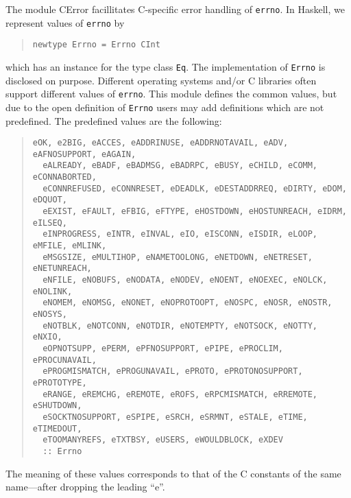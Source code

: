\documentclass[a4paper,twosides]{article}
\newcommand{\code}[1]{\texttt{#1}}      %
\begin{document}
The module CError facillitates C-specific error handling of \code{errno}.  In
Haskell, we represent values of \code{errno} by
%
\begin{quote}
\begin{verbatim}
newtype Errno = Errno CInt
\end{verbatim}
\end{quote}
%
which has an instance for the type class \code{Eq}.  The implementation of
\code{Errno} is disclosed on purpose.  Different operating systems and/or C
libraries often support different values of \code{errno}.  This module defines
the common values, but due to the open definition of \code{Errno} users may
add definitions which are not predefined.  The predefined values are the
following:
%
\begin{quote}
\begin{verbatim}
eOK, e2BIG, eACCES, eADDRINUSE, eADDRNOTAVAIL, eADV, eAFNOSUPPORT, eAGAIN, 
  eALREADY, eBADF, eBADMSG, eBADRPC, eBUSY, eCHILD, eCOMM, eCONNABORTED, 
  eCONNREFUSED, eCONNRESET, eDEADLK, eDESTADDRREQ, eDIRTY, eDOM, eDQUOT, 
  eEXIST, eFAULT, eFBIG, eFTYPE, eHOSTDOWN, eHOSTUNREACH, eIDRM, eILSEQ, 
  eINPROGRESS, eINTR, eINVAL, eIO, eISCONN, eISDIR, eLOOP, eMFILE, eMLINK, 
  eMSGSIZE, eMULTIHOP, eNAMETOOLONG, eNETDOWN, eNETRESET, eNETUNREACH, 
  eNFILE, eNOBUFS, eNODATA, eNODEV, eNOENT, eNOEXEC, eNOLCK, eNOLINK, 
  eNOMEM, eNOMSG, eNONET, eNOPROTOOPT, eNOSPC, eNOSR, eNOSTR, eNOSYS, 
  eNOTBLK, eNOTCONN, eNOTDIR, eNOTEMPTY, eNOTSOCK, eNOTTY, eNXIO, 
  eOPNOTSUPP, ePERM, ePFNOSUPPORT, ePIPE, ePROCLIM, ePROCUNAVAIL, 
  ePROGMISMATCH, ePROGUNAVAIL, ePROTO, ePROTONOSUPPORT, ePROTOTYPE, 
  eRANGE, eREMCHG, eREMOTE, eROFS, eRPCMISMATCH, eRREMOTE, eSHUTDOWN, 
  eSOCKTNOSUPPORT, eSPIPE, eSRCH, eSRMNT, eSTALE, eTIME, eTIMEDOUT, 
  eTOOMANYREFS, eTXTBSY, eUSERS, eWOULDBLOCK, eXDEV
  :: Errno
\end{verbatim}
\end{quote}
%
The meaning of these values corresponds to that of the C constants of the same
name---after dropping the leading ``e''.
\end{document}
